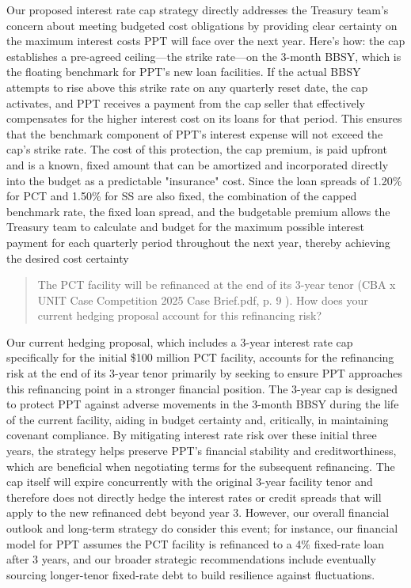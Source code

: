 \documentclass[11pt, a4paper, british]{article}
\begin{document}
Our proposed interest rate cap strategy directly addresses the Treasury team's concern about meeting budgeted cost obligations by providing clear certainty on the maximum interest costs PPT will face over the next year. Here's how: the cap establishes a pre-agreed ceiling—the strike rate—on the 3-month BBSY, which is the floating benchmark for PPT's new loan facilities. If the actual BBSY attempts to rise above this strike rate on any quarterly reset date, the cap activates, and PPT receives a payment from the cap seller that effectively compensates for the higher interest cost on its loans for that period. This ensures that the benchmark component of PPT's interest expense will not exceed the cap's strike rate. The cost of this protection, the cap premium, is paid upfront and is a known, fixed amount that can be amortized and incorporated directly into the budget as a predictable "insurance" cost. Since the loan spreads of 1.20\% for PCT and 1.50\% for SS are also fixed, the combination of the capped benchmark rate, the fixed loan spread, and the budgetable premium allows the Treasury team to calculate and budget for the maximum possible interest payment for each quarterly period throughout the next year, thereby achieving the desired cost certainty

\newpage

\begin{quote}
    The PCT facility will be refinanced at the end of its 3-year tenor (CBA x UNIT Case Competition 2025 Case Brief.pdf, p. 9 ). How does your current hedging proposal account for this refinancing risk?
\end{quote}

Our current hedging proposal, which includes a 3-year interest rate cap specifically for the initial \$100 million PCT facility, accounts for the refinancing risk at the end of its 3-year tenor primarily by seeking to ensure PPT approaches this refinancing point in a stronger financial position. The 3-year cap is designed to protect PPT against adverse movements in the 3-month BBSY during the life of the current facility, aiding in budget certainty and, critically, in maintaining covenant compliance. By mitigating interest rate risk over these initial three years, the strategy helps preserve PPT’s financial stability and creditworthiness, which are beneficial when negotiating terms for the subsequent refinancing. The cap itself will expire concurrently with the original 3-year facility tenor  and therefore does not directly hedge the interest rates or credit spreads that will apply to the new refinanced debt beyond year 3. However, our overall financial outlook and long-term strategy do consider this event; for instance, our financial model for PPT assumes the PCT facility is refinanced to a 4\% fixed-rate loan after 3 years, and our broader strategic recommendations include eventually sourcing longer-tenor fixed-rate debt to build resilience against fluctuations.
\end{document}
